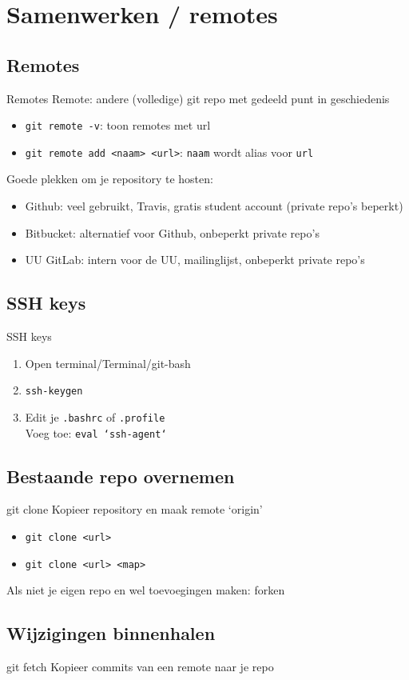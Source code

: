 \section{Samenwerken / remotes}

\subsection{Remotes}
\begin{frame}{Remotes}
	Remote: andere (volledige) git repo met gedeeld punt in geschiedenis
	\begin{itemize}
		\item \texttt{git remote -v}: toon remotes met url
		\item \texttt{git remote add <naam> <url>}: \texttt{naam} wordt alias voor \texttt{url}
	\end{itemize}
	Goede plekken om je repository te hosten:
	\begin{itemize}
		\item Github: veel gebruikt, Travis, gratis student account (private repo's beperkt)
		\item Bitbucket: alternatief voor Github, onbeperkt private repo's
		\item UU GitLab: intern voor de UU, mailinglijst, onbeperkt private repo's
	\end{itemize}
\end{frame}

\subsection{SSH keys}
\begin{frame}{SSH keys}
	\begin{enumerate}
		\item Open terminal/Terminal/git-bash
		\item \texttt{ssh-keygen}
		\item Edit je \texttt{.bashrc} of \texttt{.profile}\\
			Voeg toe: \texttt{eval `ssh-agent`}
	\end{enumerate}
\end{frame}

\subsection{Bestaande repo overnemen}
\begin{frame}{git clone}
	Kopieer repository en maak remote `origin'
	\begin{itemize}
		\item \texttt{git clone <url>}
		\item \texttt{git clone <url> <map>}
	\end{itemize}
	Als niet je eigen repo en wel toevoegingen maken: forken
\end{frame}

\subsection{Wijzigingen binnenhalen}
\begin{frame}{git fetch}
	Kopieer commits van een remote naar je repo
\end{frame}
